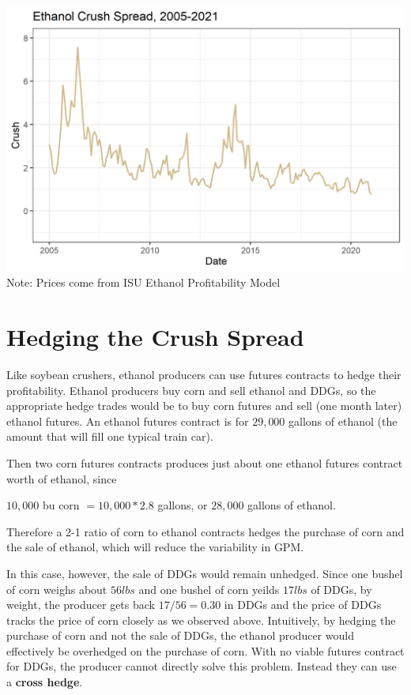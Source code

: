 \documentclass[
]{book}
\begin{document}
\includegraphics{assets/ECrushSpread.png} Note: Prices come from ISU Ethanol Profitability Model

\hypertarget{hedging-the-crush-spread}{%
\section{Hedging the Crush Spread}\label{hedging-the-crush-spread}}

Like soybean crushers, ethanol producers can use futures contracts to hedge their profitability. Ethanol producers buy corn and sell ethanol and DDGs, so the appropriate hedge trades would be to buy corn futures and sell (one month later) ethanol futures. An ethanol futures contract is for \(29,000\) gallons of ethanol (the amount that will fill one typical train car).

Then two corn futures contracts produces just about one ethanol futures contract worth of ethanol, since

\(10,000\) bu corn \(= 10,000*2.8\) gallons, or \(28,000\) gallons of ethanol.

Therefore a 2-1 ratio of corn to ethanol contracts hedges the purchase of corn and the sale of ethanol, which will reduce the variability in GPM.

In this case, however, the sale of DDGs would remain unhedged. Since one bushel of corn weighs about \(56lbs\) and one bushel of corn yeilds \(17lbs\) of DDGs, by weight, the producer gets back \(17/56 = 0.30\) in DDGs and the price of DDGs tracks the price of corn closely as we observed above. Intuitively, by hedging the purchase of corn and not the sale of DDGs, the ethanol producer would effectively be overhedged on the purchase of corn. With no viable futures contract for DDGs, the producer cannot directly solve this problem. Instead they can use a \textbf{cross hedge}.
\end{document}

